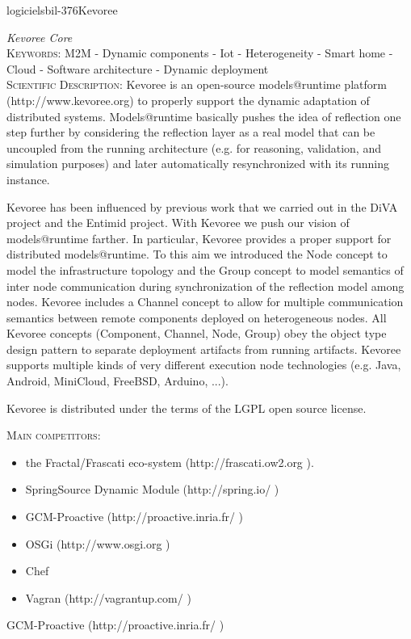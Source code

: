 \documentclass{ra2018}
\begin{document}
 \begin{module}{logiciels}{bil-376}{Kevoree}

 \textit{Kevoree Core} \\ 


   \textsc{Keywords:} M2M - Dynamic components - Iot - Heterogeneity - Smart home - Cloud - Software architecture - Dynamic deployment \\ 


    \textsc{Scientific Description:} Kevoree is an open-source models@runtime platform (http://www.kevoree.org) to properly support the dynamic adaptation of distributed systems. Models@runtime basically pushes the idea of reflection one step further by considering the reflection layer as a real model that can be uncoupled from the running architecture (e.g. for reasoning, validation, and simulation purposes) and later automatically resynchronized with its running instance.

Kevoree has been influenced by previous work that we carried out in the DiVA project and the Entimid project. With Kevoree we push our vision of models@runtime farther. In particular, Kevoree provides a proper support for distributed models@runtime. To this aim we introduced the Node concept to model the infrastructure topology and the Group concept to model semantics of inter node communication during synchronization of the reflection model among nodes. Kevoree includes a Channel concept to allow for multiple communication semantics between remote components deployed on heterogeneous nodes. All Kevoree concepts (Component, Channel, Node, Group) obey the object type design pattern to separate deployment artifacts from running artifacts. Kevoree supports multiple kinds of very different execution node technologies (e.g. Java, Android, MiniCloud, FreeBSD, Arduino, ...).

Kevoree is distributed under the terms of the LGPL open source license.

\textsc{Main competitors:}
\begin{itemize}
	\item the Fractal/Frascati eco-system (http://frascati.ow2.org ).
 	\item SpringSource Dynamic Module (http://spring.io/ )
 	\item GCM-Proactive (http://proactive.inria.fr/ )
 	\item OSGi (http://www.osgi.org ) 
 	\item Chef
 	\item Vagran (http://vagrantup.com/ )
\end{itemize}
    GCM-Proactive (http://proactive.inria.fr/ )


\end{module}
\end{document}
